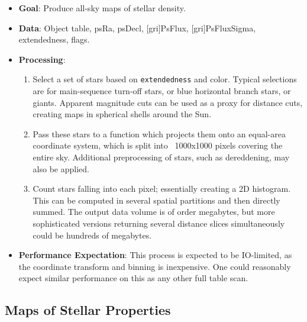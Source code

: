 \documentclass[DM,authoryear,toc]{lsstdoc}
\begin{document}
\begin{itemize}
  \item \textbf{Goal}: Produce all-sky maps of stellar density.
  \item \textbf{Data}: Object table, psRa, psDecl, [gri]PsFlux, [gri]PsFluxSigma,
  extendedness, flags.
  \item \textbf{Processing}:
    \begin{enumerate}
      \item Select a set of stars based on \texttt{extendedness} and color.
      Typical selections are for main-sequence turn-off stars, or blue
      horizontal branch stars, or giants. Apparent magnitude cuts can be used as
      a proxy for distance cuts, creating maps in spherical shells around the
      Sun.
      \item Pass these stars to a function which projects them onto an
      equal-area coordinate system, which is split into ~1000x1000 pixels
      covering the entire sky. Additional preprocessing of stars, such as
      dereddening, may also be applied.
      \item Count stars falling into each pixel; essentially creating a 2D
      histogram. This can be computed in several spatial partitions and then
      directly summed. The output data volume is of order megabytes, but more
      sophisticated versions returning several distance slices simultaneously
      could be hundreds of megabytes.
    \end{enumerate}
  \item \textbf{Performance Expectation}: This process is expected to be
  IO-limited, as the coordinate transform and binning is inexpensive. One could
  reasonably expect similar performance on this as any other full table scan.
\end{itemize}

\subsection{Maps of Stellar Properties}
\end{document}
